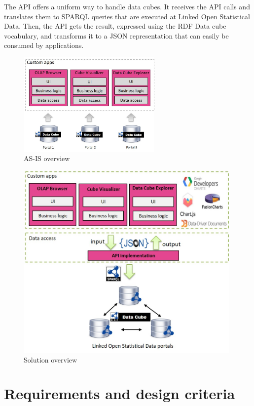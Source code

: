 \documentclass{llncs}
\begin{document}
The API offers a uniform way to handle data cubes. It receives the API calls and translates them to SPARQL queries that are executed at Linked Open Statistical Data. Then, the API gets the result, expressed using the RDF Data cube vocabulary, and transforms it to a JSON representation that can easily be consumed by applications.

\begin{figure}
\begin{center}
  \includegraphics[width=70mm]{images/overview1.jpg}
  \end{center}
\caption{AS-IS overview}
\label{fig:overview1}
\end{figure}


\begin{figure}[h!]
  \includegraphics[width=110mm]{images/overview.jpg}
\caption{Solution overview}
\label{fig:overview}
\end{figure}


\section{Requirements and design criteria}\label{sec:reqs}
\end{document}
